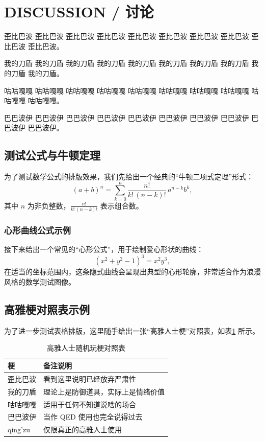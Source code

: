 \section{DISCUSSION / 讨论}

歪比巴波 歪比巴波 歪比巴波 歪比巴波 歪比巴波 歪比巴波 歪比巴波 歪比巴波 歪比巴波 歪比巴波。

我的刀盾 我的刀盾 我的刀盾 我的刀盾 我的刀盾 我的刀盾 我的刀盾 我的刀盾 我的刀盾 我的刀盾。

咕咕嘎嘎 咕咕嘎嘎 咕咕嘎嘎 咕咕嘎嘎 咕咕嘎嘎 咕咕嘎嘎 咕咕嘎嘎 咕咕嘎嘎 咕咕嘎嘎 咕咕嘎嘎。

巴巴波伊 巴巴波伊 巴巴波伊 巴巴波伊 巴巴波伊 巴巴波伊 巴巴波伊 巴巴波伊 巴巴波伊 巴巴波伊。

\subsection{测试公式与牛顿定理}

为了测试数学公式的排版效果，我们先给出一个经典的“牛顿二项式定理”形式：
\[
(a + b)^n = \sum_{k=0}^{n} \frac{n!}{k!\,(n-k)!}\, a^{n-k} b^{k},
\]
其中 \(n\) 为非负整数，\(\frac{n!}{k!\,(n-k)!}\) 表示组合数。

\subsubsection{心形曲线公式示例}

接下来给出一个常见的“心形公式”，用于绘制爱心形状的曲线：
\[
(x^2 + y^2 - 1)^3 = x^2 y^3,
\]
在适当的坐标范围内，这条隐式曲线会呈现出典型的心形轮廓，非常适合作为浪漫风格的数学测试图像。

\subsection{高雅梗对照表示例}

为了进一步测试表格排版，这里随手给出一张“高雅人士梗”对照表，如表\ref{tab:memes} 所示。

\begin{table}[htbp]
  \centering
  \caption{高雅人士随机玩梗对照表}
  \label{tab:memes}
  \begin{tabular}{ll}
    \hline
    梗 & 备注说明 \\
    \hline
    歪比巴波 & 看到这里说明已经放弃严肃性 \\
    我的刀盾 & 理论上是防御道具，实际上是情绪价值 \\
    咕咕嘎嘎 & 适用于任何不知道说啥的场合 \\
    巴巴波伊 & 当作 QED 使用也完全说得过去 \\
    qing'zu   & 仅限真正的高雅人士使用 \\
    \hline
  \end{tabular}
\end{table}
